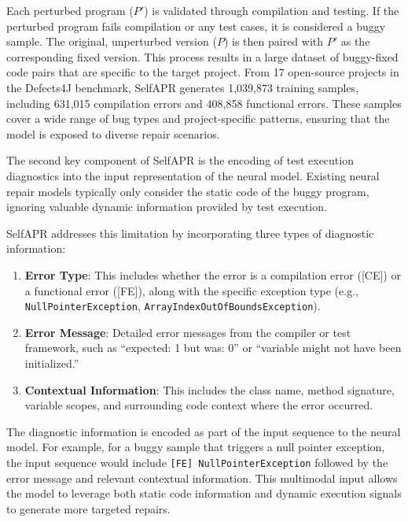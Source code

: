 \documentclass[manuscript,screen,review]{acmart}
\begin{document}
Each perturbed program (\(P'\)) is validated through compilation and testing. If the perturbed program fails compilation or any test cases, it is considered a buggy sample. The original, unperturbed version (\(P\)) is then paired with \(P'\) as the corresponding fixed version. This process results in a large dataset of buggy-fixed code pairs that are specific to the target project. From 17 open-source projects in the Defects4J benchmark, SelfAPR generates 1,039,873 training samples, including 631,015 compilation errors and 408,858 functional errors. These samples cover a wide range of bug types and project-specific patterns, ensuring that the model is exposed to diverse repair scenarios.

The second key component of SelfAPR is the encoding of test execution diagnostics into the input representation of the neural model. Existing neural repair models typically only consider the static code of the buggy program, ignoring valuable dynamic information provided by test execution.

SelfAPR addresses this limitation by incorporating three types of diagnostic information:

\begin{enumerate}
\item \textbf{Error Type}: This includes whether the error is a compilation error ([CE]) or a functional error ([FE]), along with the specific exception type (e.g., \texttt{NullPointerException}, \texttt{ArrayIndexOutOfBoundsException}).

\item \textbf{Error Message}: Detailed error messages from the compiler or test framework, such as ``expected: 1 but was: 0'' or ``variable might not have been initialized.''

\item \textbf{Contextual Information}: This includes the class name, method signature, variable scopes, and surrounding code context where the error occurred.
\end{enumerate}

The diagnostic information is encoded as part of the input sequence to the neural model. For example, for a buggy sample that triggers a null pointer exception, the input sequence would include \texttt{[FE] NullPointerException} followed by the error message and relevant contextual information. This multimodal input allows the model to leverage both static code information and dynamic execution signals to generate more targeted repairs.
\end{document}
